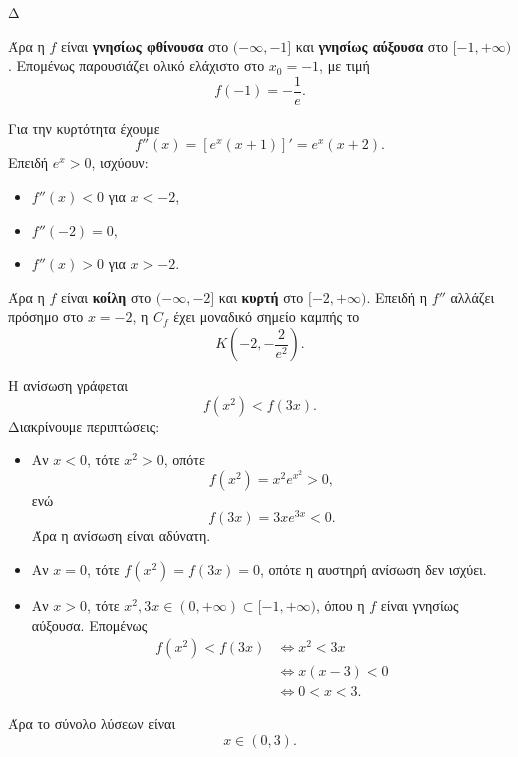 \begin{thema}{Δ}
\begin{erwthma}
Άρα η $f$ είναι \textbf{γνησίως φθίνουσα} στο $(-\infty,-1]$ και \textbf{γνησίως αύξουσα} στο $[-1,+\infty)$. Επομένως παρουσιάζει ολικό ελάχιστο στο $x_0=-1$, με τιμή
\[
{f(-1)=-\frac{1}{e}}.
\]

Για την κυρτότητα έχουμε
\[
f''(x)=\left[e^x(x+1)\right]'=e^x(x+2).
\]
Επειδή $e^x>0$, ισχύουν:
\begin{itemize}
\item $f''(x)<0$ για $x<-2$,
\item $f''(-2)=0$,
\item $f''(x)>0$ για $x>-2$.
\end{itemize}
Άρα η $f$ είναι \textbf{κοίλη} στο $(-\infty,-2]$ και \textbf{κυρτή} στο $[-2,+\infty)$. Επειδή η $f''$ αλλάζει πρόσημο στο $x=-2$, η $C_f$ έχει μοναδικό σημείο καμπής το
\[
{K\left(-2,-\frac{2}{e^2}\right)}.
\]

\item Η ανίσωση γράφεται
\[
f(x^2)<f(3x).
\]
Διακρίνουμε περιπτώσεις:
\begin{itemize}
\item Αν $x<0$, τότε $x^2>0$, οπότε
\[
f(x^2)=x^2e^{x^2}>0,
\]
ενώ
\[
f(3x)=3xe^{3x}<0.
\]
Άρα η ανίσωση είναι αδύνατη.

\item Αν $x=0$, τότε $f(x^2)=f(3x)=0$, οπότε η αυστηρή ανίσωση δεν ισχύει.

\item Αν $x>0$, τότε $x^2,3x\in(0,+\infty)\subset[-1,+\infty)$, όπου η $f$ είναι γνησίως αύξουσα. Επομένως
\begin{align*}
f(x^2)<f(3x)
&\Leftrightarrow x^2<3x\\
&\Leftrightarrow x(x-3)<0\\
&\Leftrightarrow 0<x<3.
\end{align*}
\end{itemize}
Άρα το σύνολο λύσεων είναι
\[
{x\in(0,3)}.
\]
\end{erwthma}
\end{thema}

